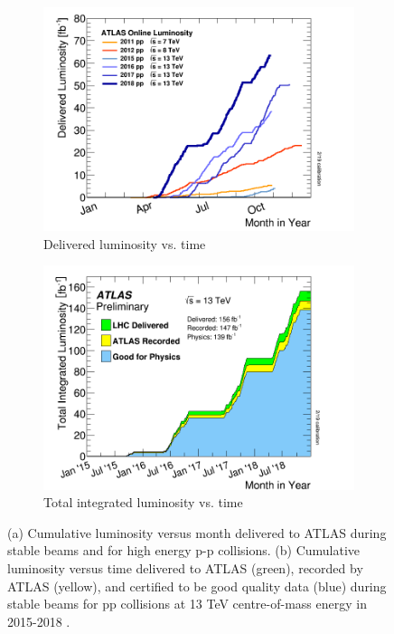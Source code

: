 \documentclass[12pt,a4paper,epsf,portrait,times,epsfig]{report}
\begin{document}
		\begin{figure}
			\begin{subfigure}{.49\textwidth}
				\centering
				\includegraphics[scale=0.27]{ATLAS_Luminosity_Time.png}
				\caption{Delivered luminosity vs. time}
				\label{Fig:SFigATLASLuminosityTime}
			\end{subfigure}
			\begin{subfigure}{.49\textwidth}
				\centering
				\includegraphics[scale=0.27]{ATLAS_Luminosity_Total.png}
				\caption{Total integrated luminosity vs. time}
				\label{Fig:SFigATLASLuminosityTotal}
			\end{subfigure}
			\caption{ (a) Cumulative luminosity versus month delivered to ATLAS during stable beams and for high energy p-p collisions. (b) Cumulative luminosity versus time delivered to ATLAS (green), recorded by ATLAS (yellow), and certified to be good quality data (blue) during stable beams for pp collisions at 13 TeV centre-of-mass energy in 2015-2018 \cite{ATLASLumiPublic}.}
			\label{Fig:ATLASLuminosity}
		\end{figure}
\end{document}
